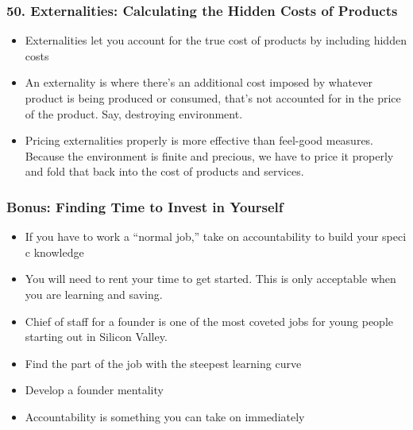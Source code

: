\begin{frame}[fragile]
\frametitle{50. Externalities: Calculating the Hidden Costs of Products}
\begin{itemize}
\item Externalities let you account for the true cost of products by including hidden costs
\item  An externality is where there’s an additional cost imposed by whatever product is being produced
or consumed, that’s not accounted for in the price of the product. Say, destroying environment.
\item Pricing externalities properly is more effective than feel-good measures. Because the environment is  finite and precious, we have to price it properly and fold that back into the
cost of products and services.
\end{itemize}
\end{frame}


\begin{frame}[fragile]
\frametitle{Bonus: Finding Time to Invest in Yourself}
\begin{itemize}
\item If you have to work a “normal job,” take on accountability to build your speci c knowledge
\item You will need to rent your time to get started.
This is only acceptable when you are learning and saving.
\item Chief of staff  for a founder is one of the most coveted jobs for young people starting out in Silicon Valley.
\item Find the part of the job with the steepest learning curve
\item Develop a founder mentality
\item Accountability is something you can take on immediately
\end{itemize}
\end{frame}

